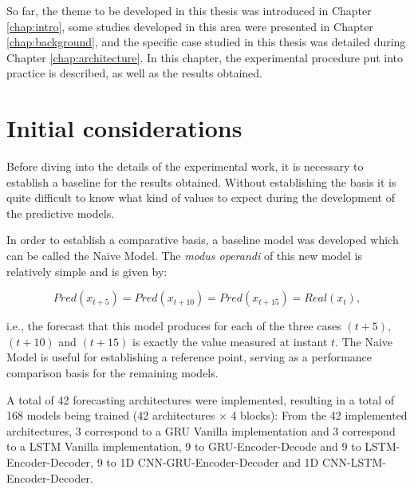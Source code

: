 \cleardoublepage
\label{chap:results}

So far, the theme to be developed in this thesis was introduced in Chapter \ref{chap:intro}, some studies developed in this area were presented in Chapter \ref{chap:background}, and the specific case studied in this thesis was detailed during Chapter \ref{chap:architecture}. In this chapter, the experimental procedure put into practice is described, as well as the results obtained.



\section{Initial considerations}\label{sub:initial}

Before diving into the details of the experimental work, it is necessary to establish a baseline for the results obtained. Without establishing the basis it is quite difficult to know what kind of values to expect during the development of the predictive models. 

In order to establish a comparative basis, a baseline model was developed which can be called the Naive Model. The \textit{modus operandi} of this new model is relatively simple and is given by:

\begin{equation}
   Pred(x_{t+5}) = Pred(x_{t+10}) = Pred(x_{t+15}) = Real(x_{t}),
   \label{naive}
\end{equation}

i.e., the forecast that this model produces for each of the three cases $(t+5)$, $(t+10)$ and $(t+15)$ is exactly the value measured at instant $t$. The Naive Model is useful for establishing a reference point, serving as a performance comparison basis for the remaining models.

A total of 42 forecasting architectures were implemented, resulting in a total of 168 models being trained (42 architectures $\times$ 4 blocks): From the 42 implemented architectures, 3 correspond to a \ac{GRU} Vanilla implementation and 3 correspond to a \ac{LSTM} Vanilla implementation, 9 to \ac{GRU}-Encoder-Decode and
9 to \ac{LSTM}-Encoder-Decoder, 9 to \ac{1D CNN}-\ac{GRU}-Encoder-Decoder and \ac{1D CNN}-\ac{LSTM}-Encoder-Decoder.


